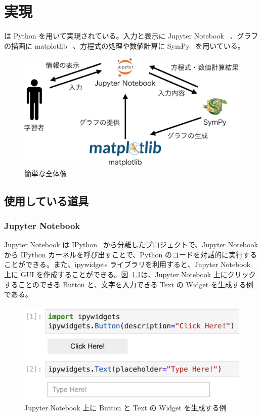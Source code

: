 \chapter{実現} \label{implementation}

\simname は Python を用いて実現されている。入力と表示に Jupyter Notebook~\cite{kluyver_jupyter_nodate} 、グラフの描画に matplotlib~\cite{hunter_matplotlib_2007} 、方程式の処理や数値計算に SymPy~\cite{meurer_sympy_2017} を用いている。

\begin{figure}[htb]
\centering
\includegraphics[width=0.8\linewidth]{work/imple_diagram-crop.pdf}
\caption{簡単な全体像}
\end{figure}

\section{使用している道具}

\subsection{Jupyter Notebook}
Jupyter Notebook は IPython~\cite{perez_ipython_2007} から分離したプロジェクトで、Jupyter Notebook から IPython カーネルを呼び出すことで、Python のコードを対話的に実行することができる。また、ipywidgets ライブラリを利用すると、Jupyter Notebook 上に GUI を作成することができる。図~\ref{example_jupyter}は、Jupyter Notebook 上にクリックすることのできる Button と、文字を入力できる Text の Widget を生成する例である。

\begin{figure}[htb]
\centering
\includegraphics[width=0.9\linewidth]{work/example_jupyter.png}
\caption{Jupyter Notebook 上に Button と Text の
Widget を生成する例} \label{example_jupyter}
\end{figure}

